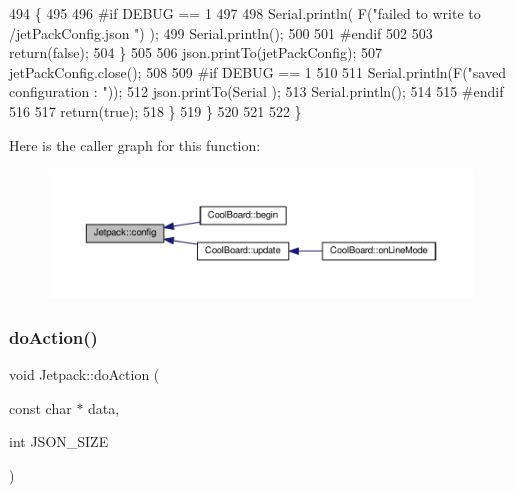 \begin{DoxyCode}
494             \{
495             
496 \textcolor{preprocessor}{            #if DEBUG == 1 }
497 
498                 Serial.println( F(\textcolor{stringliteral}{"failed to write to /jetPackConfig.json "}) );
499                 Serial.println();
500             
501 \textcolor{preprocessor}{            #endif}
502                 
503                 \textcolor{keywordflow}{return}(\textcolor{keyword}{false});          
504             \}  
505 
506             json.printTo(jetPackConfig);
507             jetPackConfig.close();
508 
509 \textcolor{preprocessor}{        #if DEBUG == 1 }
510             
511             Serial.println(F(\textcolor{stringliteral}{"saved configuration : "}));
512             json.printTo(Serial );
513             Serial.println();       
514         
515 \textcolor{preprocessor}{        #endif}
516 
517             \textcolor{keywordflow}{return}(\textcolor{keyword}{true}); 
518         \}
519     \}   
520     
521 
522 \}
\end{DoxyCode}
Here is the caller graph for this function\+:\nopagebreak
\begin{figure}[H]
\begin{center}
\leavevmode
\includegraphics[width=350pt]{classJetpack_ab065ee83e244265a2223a22f3ee4a719_icgraph}
\end{center}
\end{figure}
\mbox{\label{classJetpack_a86d2e83436ef4b85f4c3a6e85ac785b0}} 
\subsubsection{\texorpdfstring{do\+Action()}{doAction()}}
{\footnotesize\ttfamily void Jetpack\+::do\+Action (\begin{DoxyParamCaption}\item[{const char $\ast$}]{data,  }\item[{int}]{J\+S\+O\+N\+\_\+\+S\+I\+ZE }\end{DoxyParamCaption})}

